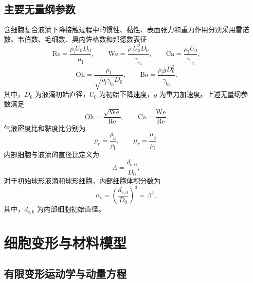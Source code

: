 \subsection{主要无量纲参数}

含细胞复合液滴下降接触过程中的惯性、黏性、表面张力和重力作用分别采用雷诺数、韦伯数、毛细数、奥内佐格数和邦德数表征
\begin{equation}
\mathrm{Re}
=
\frac{\rho_{\mathrm l}U_0D_0}{\mu_{\mathrm l}},
\qquad
\mathrm{We}
=
\frac{\rho_{\mathrm l}U_0^2D_0}{\gamma_{\mathrm{lg}}},
\qquad
\mathrm{Ca}
=
\frac{\mu_{\mathrm l}U_0}{\gamma_{\mathrm{lg}}},
\label{eq:ch2_re_we_ca}
\end{equation}
\begin{equation}
\mathrm{Oh}
=
\frac{\mu_{\mathrm l}}
{\sqrt{\rho_{\mathrm l}\gamma_{\mathrm{lg}}D_0}},
\qquad
\mathrm{Bo}
=
\frac{\rho_{\mathrm l}gD_0^2}{\gamma_{\mathrm{lg}}}.
\label{eq:ch2_oh_bo}
\end{equation}
其中，$D_0$ 为液滴初始直径，$U_0$ 为初始下降速度，$g$ 为重力加速度。上述无量纲参数满足
\begin{equation}
\mathrm{Oh}=\frac{\sqrt{\mathrm{We}}}{\mathrm{Re}},
\qquad
\mathrm{Ca}=\frac{\mathrm{We}}{\mathrm{Re}}.
\label{eq:ch2_dimensionless_relation}
\end{equation}
气液密度比和黏度比分别为
\begin{equation}
\rho_r=\frac{\rho_{\mathrm g}}{\rho_{\mathrm l}},
\qquad
\mu_r=\frac{\mu_{\mathrm g}}{\mu_{\mathrm l}}.
\label{eq:ch2_property_ratio}
\end{equation}
内部细胞与液滴的直径比定义为
\begin{equation}
\Lambda
=
\frac{d_{\mathrm s,0}}{D_0},
\label{eq:ch2_size_ratio}
\end{equation}
对于初始球形液滴和球形细胞，内部细胞体积分数为
\begin{equation}
\alpha_{\mathrm s}
=
\left(\frac{d_{\mathrm s,0}}{D_0}\right)^3
=
\Lambda^3,
\label{eq:ch2_volume_fraction}
\end{equation}
其中，$d_{\mathrm s,0}$ 为内部细胞初始直径。

\section{细胞变形与材料模型}

\subsection{有限变形运动学与动量方程}

